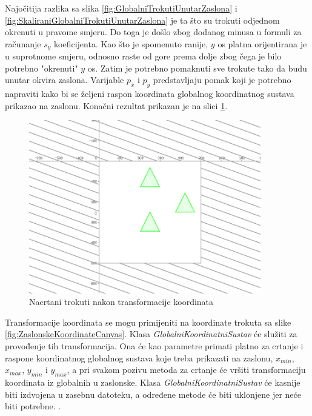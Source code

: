 \documentclass{foi}
\begin{document}
Najočitija razlika sa slika \ref{fig:GlobalniTrokutiUnutarZaslona} i \ref{fig:SkaliraniGlobalniTrokutiUnutarZaslona} je ta što su trokuti odjednom okrenuti u pravome smjeru. Do toga je došlo zbog dodanog minusa u formuli za računanje $s_y$ koeficijenta. Kao što je spomenuto ranije, $y$ os platna orijentirana je u suprotnome smjeru, odnosno raste od gore prema dolje zbog čega je bilo potrebno "okrenuti" $y$ os. Zatim je potrebno pomaknuti sve trokute tako da budu unutar okvira zaslona. Varijable $p_x$ i $p_y$ predstavljaju pomak koji je potrebno napraviti kako bi se željeni raspon koordinata globalnog koordinatnog sustava prikazao na zaslonu. Konačni rezultat prikazan je na slici \ref{fig:TransformiraneGlobalneUZaslonske}. 

\begin{figure}[H]
    \centering
    \includegraphics[width=0.9\textwidth]{slike/7_TransformiraneGlobalneUZaslonske.png}
    \captionsetup{justification=centering}
    \caption{Nacrtani trokuti nakon transformacije koordinata}
\label{fig:TransformiraneGlobalneUZaslonske}
\end{figure}

Transformacije koordinata se mogu primijeniti na koordinate trokuta sa slike \ref{fig:ZaslonskeKoordinateCanvas}. Klasa \textit{GlobalniKoordinatniSustav} će služiti za provođenje tih transformacija. Ona će kao parametre primati platno za crtanje i raspone koordinatnog globalnog sustava koje treba prikazati na zaslonu, $x_{min}$, $x_{max}$, $y_{min}$ i $y_{max}$, a pri svakom pozivu metoda za crtanje će vršiti transformaciju koordinata iz globalnih u zaslonske. Klasa \textit{GlobalniKoordinatniSustav} će kasnije biti izdvojena u zasebnu datoteku, a određene metode će biti uklonjene jer neće biti potrebne. \parencite{HipHorvatUvod}. 
\end{document}
